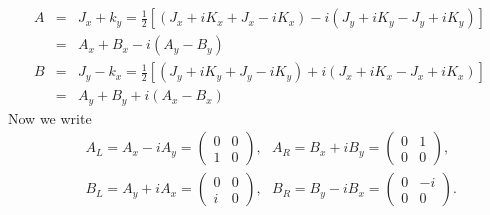 \documentclass[11pt]{article}
\begin{document}
\section{ }
\begin{eqnarray}
    A&=& J_x+k_y = \frac{1}{2}[(J_x+iK_x+J_x-iK_x)-i(J_y+iK_y-J_y+iK_y)]\\
    &=&A_x+B_x-i(A_y-B_y) \\
    B&=& J_y-k_x = \frac{1}{2}[(J_y+iK_y+J_y-iK_y)+i(J_x+iK_x-J_x+iK_x)]\\
    &=&A_y+B_y+i(A_x-B_x) 
\end{eqnarray}
Now we write
\begin{eqnarray}
    &&A_L=A_x-iA_y = 
    \begin{pmatrix}
        0 & 0 \\
        1 & 0
    \end{pmatrix},~~~
    A_R=B_x+iB_y = 
    \begin{pmatrix}
        0 & 1 \\
        0 & 0
    \end{pmatrix},\\
    &&B_L=A_y+iA_x = 
    \begin{pmatrix}
        0 & 0 \\
        i & 0
    \end{pmatrix},~~~
    B_R=B_y-iB_x = 
    \begin{pmatrix}
        0 & -i \\
        0 & 0
    \end{pmatrix}.
\end{eqnarray}
\end{document}
